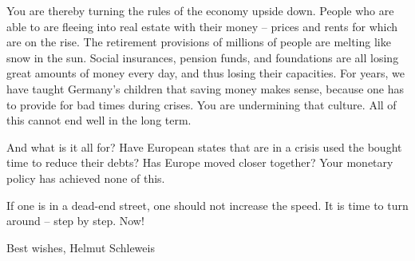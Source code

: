 {{You are thereby turning the rules of the economy upside down. People who are able to are fleeing into real estate with their money – prices and rents for which are on the rise. The retirement provisions of millions of people are melting like snow in the sun. Social insurances, pension funds, and foundations are all losing great amounts of money every day, and thus losing their capacities. For years, we have taught Germany’s children that saving money makes sense, because one has to provide for bad times during crises. You are undermining that culture. All of this cannot end well in the long term.

And what is it all for? Have European states that are in a crisis used the bought time to reduce their debts? Has Europe moved closer together? Your monetary policy has achieved none of this.

If one is in a dead-end street, one should not increase the speed. It is time to turn around – step by step. Now!

Best wishes,
Helmut Schleweis
}
}

